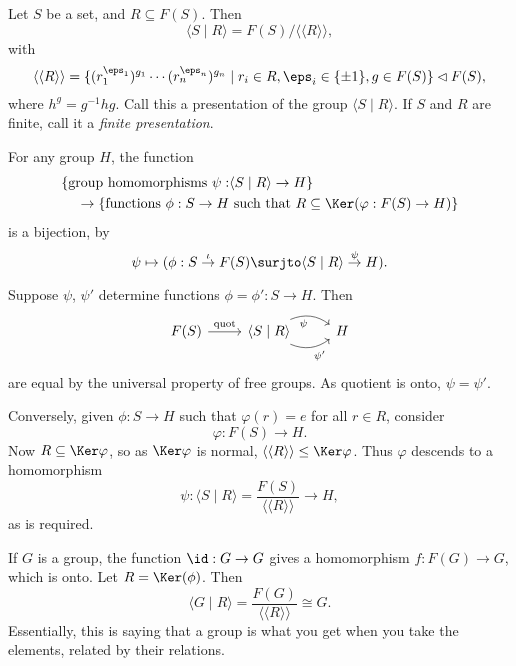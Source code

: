 \documentclass[12pt]{article}
\begin{document}
\begin{definition}
	Let $S$ be a set, and $R \subseteq F(S)$. Then
	\[
	\langle S \mid R \rangle = F(S) / \langle\langle R \rangle\rangle,
	\]
	with
	\[
		\langle\langle R \rangle\rangle = \{(r_1^{\eps_1})^{g_1} \cdots (r_n^{\eps_n})^{g_n} \mid r_i \in R, \eps_i \in \{\pm1\}, g \in F(S)\} \lhd F(S),
	\]
	where $h^g = g^{-1}hg$. Call this a presentation of the group $\langle S \mid R \rangle$. If $S$ and $R$ are finite, call it a \emph{finite presentation}.
\end{definition}

\begin{lemma}
	For any group $H$, the function
	\begin{align*}
		\{\text{group homomorphisms }\psi : &\langle S \mid R \rangle \to H\} \\
		\to \{\text{functions } \phi : S \to H &\text{ such that } R \subseteq \Ker(\varphi : F(S) \to H)\}
	\end{align*}
	is a bijection, by
	\[
		\psi \mapsto (\phi : S \overset{\iota}{\to} F(S) \surjto \langle S \mid R \rangle \overset{\psi}{\to} H).
	\]
\end{lemma}


\begin{proofbox}
	Suppose $\psi$, $\psi'$ determine functions $\phi = \phi' : S \to H$. Then
	\[
		\begin{tikzcd}
			F(S) \arrow[r, "\text{quot}"] & \langle S \mid R \rangle \arrow[r, bend left, "\psi"'] \arrow[r, bend right, "\psi'"'] & H
		\end{tikzcd}	
	\]
	are equal by the universal property of free groups. As quotient is onto, $\psi = \psi'$.

	Conversely, given $\phi: S \to H$ such that $\varphi(r) = e$ for all $r \in R$, consider
	\[
	\varphi : F(S) \to H.
	\]
	Now $R \subseteq \Ker \varphi$, so as $\Ker \varphi$ is normal, $\langle \langle R \rangle \rangle \leq \Ker \varphi$. Thus $\varphi$ descends to a homomorphism
	\[
	\psi : \langle S \mid R \rangle = \frac{F(S)}{\langle \langle R \rangle \rangle } \to H,
	\]
	as is required.
\end{proofbox}

\begin{exbox}
	If $G$ is a group, the function $\id : G \to G$ gives a homomorphism $f : F(G) \to G$, which is onto. Let $R = \Ker(\phi)$. Then
	\[
	\langle G \mid R \rangle = \frac{F(G)}{\langle \langle R \rangle \rangle} \cong G.
	\]
	Essentially, this is saying that a group is what you get when you take the elements, related by their relations.
\end{exbox}
\end{document}
